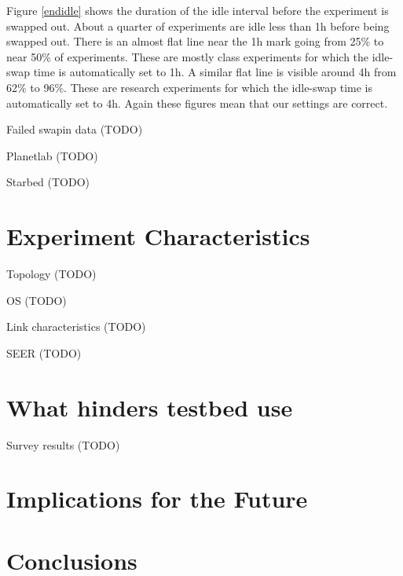 \documentclass[10pt]{article}
\begin{document}
Figure \ref{endidle} shows the duration of the idle interval before the experiment is swapped out. About a quarter of experiments are idle less than 1h before being swapped out. There is an almost flat line near the 1h mark going from 25\% to near 50\% of experiments. These are mostly class experiments for which the idle-swap time is automatically set to 1h. A similar flat line is visible around 4h from 62\% to 96\%. These are research experiments for which the idle-swap time is automatically set to 4h. Again these figures mean that our settings are correct. 


{\color{red} Failed swapin data (TODO)}

{\color{red} Planetlab (TODO)}

{\color{red} Starbed (TODO)}

\section{Experiment Characteristics}

Topology (TODO)

OS (TODO)

Link characteristics (TODO)

SEER (TODO)

\section{What hinders testbed use}
 
Survey results (TODO)

\section{Implications for the Future}

\section{Conclusions}
\end{document}
